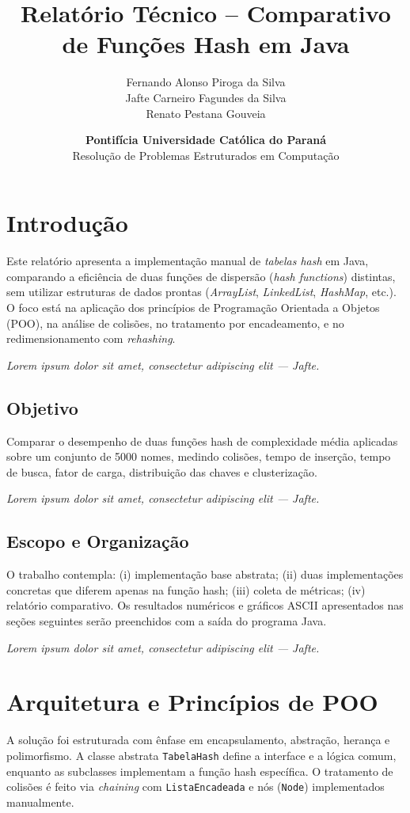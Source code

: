 \documentclass[12pt,a4paper]{abntex2}
\title{Relatório Técnico -- Comparativo de Funções Hash em Java}
\author{
  Fernando Alonso Piroga da Silva \\
  Jafte Carneiro Fagundes da Silva \\
  Renato Pestana Gouveia
}
\date{\textbf{Pontifícia Universidade Católica do Paraná} \\ Resolução de Problemas Estruturados em Computação}
\newcommand{\placeholderAluno}[1]{\textit{Lorem ipsum dolor sit amet, consectetur adipiscing elit — #1.}}
\begin{document}
\maketitle

\tableofcontents
\newpage

\section{Introdução}
Este relatório apresenta a implementação manual de \textit{tabelas hash} em Java, comparando a eficiência de duas funções de dispersão (\textit{hash functions}) distintas, sem utilizar estruturas de dados prontas (\textit{ArrayList}, \textit{LinkedList}, \textit{HashMap}, etc.). O foco está na aplicação dos princípios de Programação Orientada a Objetos (POO), na análise de colisões, no tratamento por encadeamento, e no redimensionamento com \textit{rehashing}.

\placeholderAluno{Jafte}

\subsection{Objetivo}
Comparar o desempenho de duas funções hash de complexidade média aplicadas sobre um conjunto de 5000 nomes, medindo colisões, tempo de inserção, tempo de busca, fator de carga, distribuição das chaves e clusterização.

\placeholderAluno{Jafte}

\subsection{Escopo e Organização}
O trabalho contempla: (i) implementação base abstrata; (ii) duas implementações concretas que diferem apenas na função hash; (iii) coleta de métricas; (iv) relatório comparativo. Os resultados numéricos e gráficos ASCII apresentados nas seções seguintes serão preenchidos com a saída do programa Java.

\placeholderAluno{Jafte}

\section{Arquitetura e Princípios de POO}
A solução foi estruturada com ênfase em encapsulamento, abstração, herança e polimorfismo. A classe abstrata \texttt{TabelaHash} define a interface e a lógica comum, enquanto as subclasses implementam a função hash específica. O tratamento de colisões é feito via \textit{chaining} com \texttt{ListaEncadeada} e nós (\texttt{Node}) implementados manualmente.
\end{document}

